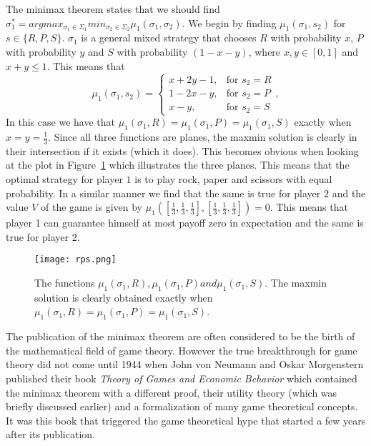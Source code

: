 \documentclass{article}
\theoremstyle{definition}
\theoremstyle{remark}
\begin{document}
The minimax theorem states that we should find $\sigma_1^* = argmax_{\sigma _1 \in
  \Sigma_1} min_{\sigma _2 \in \Sigma_2} \mu_1(\sigma_1,\sigma_2)$. We
begin by finding $\mu_1(\sigma_1,s_2)$ for $s \in
\{R,P,S\}$. $\sigma_1$ is a general mixed strategy that chooses $R$
with probability $x$, $P$ with probability $y$ and $S$ with
probability $(1-x-y)$, where $x,y \in [0,1]$ and $x+y \leq 1$. This means
that $$\mu_1(\sigma_1, s_2) = \begin{cases}
         x+2y-1, & \text{for } s_2 =  R\\
        1-2x-y, & \text{for } s_2 =  P\\
        x-y, & \text{for } s_2 =  S
      \end{cases},$$
In this case we have that $\mu_1(\sigma_1, R) =  \mu_1(\sigma_1,
P) = \mu_1(\sigma_1, S)$ exactly when $x = y = \frac{1}{3}$. Since
all three functions are planes, the maxmin solution is clearly in
their intersection if it exists (which it does). This becomes obvious
when looking at the plot in Figure~\ref{value r p s} which illustrates
the three planes. This means that the
optimal strategy for player $1$ is to play rock, paper and scissors
with equal probability. In a similar manner we find that the same is
true for player $2$ and the value $V$ of the game is given by
$\mu_1([\frac{1}{3},\frac{1}{3},\frac{1}{3}],[\frac{1}{3},\frac{1}{3},\frac{1}{3}])
= 0$. This means that player 1 can guarantee himself at most payoff zero in
expectation and the same is true for player 2.

\begin{figure}[h!]
  \begin{center}
\texttt{[image: rps.png]}
\end{center}
\caption{The functions $\mu_1(\sigma_1, R),  \mu_1(\sigma_1,
P) and \mu_1(\sigma_1, S)$. The maxmin solution is clearly obtained
exactly when $\mu_1(\sigma_1, R) =  \mu_1(\sigma_1,
P) = \mu_1(\sigma_1, S)$.}
\label{value r p s}
\end{figure}
The publication of the minimax theorem are often considered to be the
birth of the mathematical field of game theory. However the true
breakthrough for game theory did not come until 1944 when John von
Neumann and Oskar Morgenstern published their book \emph{Theory of
  Games and Economic Behavior} which contained the minimax theorem
with a different proof, their utility theory
(which was briefly discussed earlier) and a formalization
of many game theoretical concepts. It was this book that triggered the
game theoretical hype that started a few years after its
publication.
\end{document}
